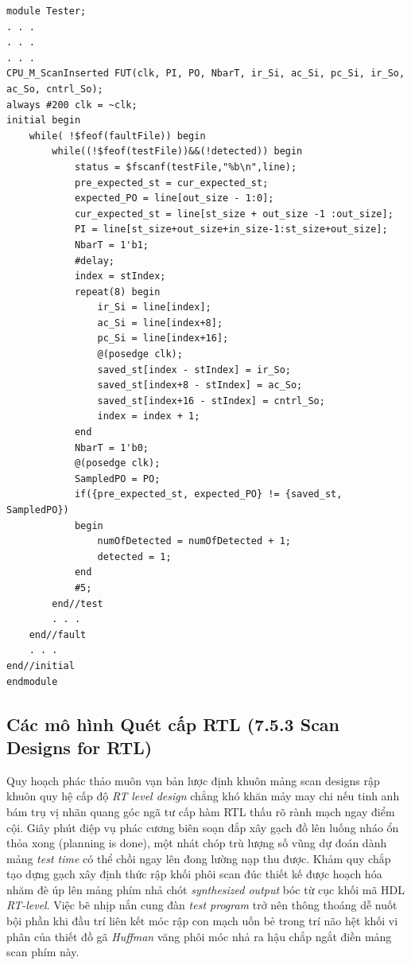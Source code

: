 \begin{lstlisting}[caption={Hình 7.56: Chương trình test dùng nhiều chuỗi quét song song (Figure 7.56 Test program for multiple parallel scans)}, label={lst:756}]
module Tester;
. . .
. . .
. . .
CPU_M_ScanInserted FUT(clk, PI, PO, NbarT, ir_Si, ac_Si, pc_Si, ir_So,
ac_So, cntrl_So);
always #200 clk = ~clk;
initial begin
    while( !$feof(faultFile)) begin
        while((!$feof(testFile))&&(!detected)) begin
            status = $fscanf(testFile,"%b\n",line);
            pre_expected_st = cur_expected_st;
            expected_PO = line[out_size - 1:0];
            cur_expected_st = line[st_size + out_size -1 :out_size];
            PI = line[st_size+out_size+in_size-1:st_size+out_size];
            NbarT = 1'b1;
            #delay;
            index = stIndex;
            repeat(8) begin
                ir_Si = line[index];
                ac_Si = line[index+8];
                pc_Si = line[index+16];
                @(posedge clk);
                saved_st[index - stIndex] = ir_So;
                saved_st[index+8 - stIndex] = ac_So;
                saved_st[index+16 - stIndex] = cntrl_So;
                index = index + 1;
            end
            NbarT = 1'b0;
            @(posedge clk);
            SampledPO = PO;
            if({pre_expected_st, expected_PO} != {saved_st, SampledPO})
            begin
                numOfDetected = numOfDetected + 1;
                detected = 1;
            end
            #5;
        end//test
        . . .
    end//fault
    . . .
end//initial
endmodule
\end{lstlisting}

\subsection{Các mô hình Quét cấp RTL (7.5.3 Scan Designs for RTL)}
Quy hoạch phác thảo muôn vạn bản lược định khuôn mảng scan designs rập khuôn quy hệ cấp độ \textit{RT level design} chẳng khó khăn mảy may chi nếu tinh anh bám trụ vị nhãn quang góc ngã tư cấp hàm RTL thấu rõ rành mạch ngay điểm cội. Giây phút điệp vụ phác cương biên soạn đắp xây gạch đồ lên luống nháo ổn thỏa xong (planning is done), một nhát chóp trù lượng số vũng dự đoán dành mảng \textit{test time} có thể chồi ngay lên đong lường nạp thu được. Khảm quy chắp tạo dựng gạch xây định thức rập khối phôi scan đúc thiết kế được hoạch hóa nhăm đè úp lên mảng phím nhả chót \textit{synthesized output} bóc từ cục khối mã HDL \textit{RT-level}. Việc bẽ nhịp nắn cung đàn \textit{test program} trở nên thông thoáng dễ nuốt bội phần khi đầu trí liên kết móc rập con mạch uốn bẻ trong trí não hệt khối vi phân của thiết đồ gã \textit{Huffman} văng phôi móc nhả ra hậu chắp ngắt điền mảng scan phím này.

